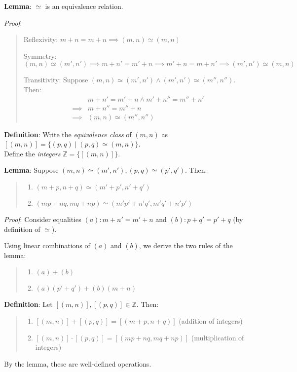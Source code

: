 \documentclass[11pt]{article}
\begin{document}
\textbf{Lemma}: $\simeq$ is an equivalence relation.

\emph{Proof}:
\begin{quote}\vspace{-1cm}
	\item Reflexivity: $m + n = m + n \implies (m,n) \simeq (m,n)$
	\item Symmetry: $(m,n) \simeq (m', n') \implies m + n' = m' + n \implies m' + n = m + n' \implies (m', n') \simeq (m, n)$
	\item Transitivity: Suppose $(m,n) \simeq (m', n') \land (m', n') \simeq (m'', n'')$. Then:
	\begin{align*}
		& m+n' = m' + n \land m' + n'' = m'' + n'\\
		\implies & m + n'' = m'' + n\\
		\implies & (m,n) \simeq (m'',n'')
	\end{align*}
\end{quote}

\textbf{Definition}: Write the \emph{equivalence class} of $(m,n)$ as $[(m,n)] = \{(p,q) \;|\; (p,q) \simeq (m,n)\}$.\\
Define the \emph{integers} $\mathbb{Z} = \{[(m,n)]\}$.

\textbf{Lemma}: Suppose $(m,n) \simeq (m', n'), (p,q) \simeq (p',q')$. Then:
\begin{quote}\vspace{-0.3cm}
	\begin{enumerate}
	\item $(m+p, n+q) \simeq (m'+p', n'+q')$
	\item $(mp+nq, mq+np) \simeq (m'p'+n'q', m'q'+n'p')$
	\end{enumerate}
\end{quote}

\emph{Proof}: Consider equalities $(a): m+n' = m'+n$ and $(b): p+q' = p'+q$ (by definition of $\simeq$).

Using linear combinations of $(a)$ and $(b)$, we derive the two rules of the lemma:
\begin{quote}\vspace{-0.3cm}
	\begin{enumerate}
	\item $(a) + (b)$
	\item $(a)(p' + q') + (b)(m + n)$
	\end{enumerate}
\end{quote}

\textbf{Definition}: Let $[(m,n)], [(p,q)] \in \mathbb{Z}$. Then:
\begin{quote}\vspace{-0.3cm}
	\begin{enumerate}
	\item $[(m,n)] + [(p,q)] = [(m+p, n+q)]$ (addition of integers)
	\item $[(m,n)] \cdot [(p,q)] = [(mp+nq, mq+np)]$ (multiplication of integers)
	\end{enumerate}
\end{quote}
By the lemma, these are well-defined operations.
\end{document}
